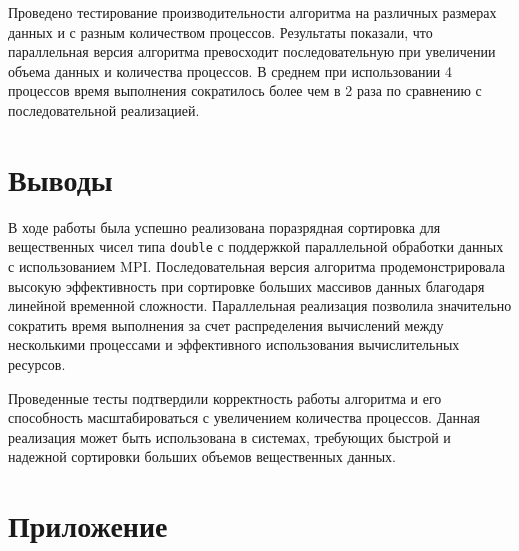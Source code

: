\documentclass[a4paper,12pt]{article}
\begin{document}
Проведено тестирование производительности алгоритма на различных размерах данных и с разным количеством процессов. Результаты показали, что параллельная версия алгоритма превосходит последовательную при увеличении объема данных и количества процессов. В среднем при использовании 4 процессов время выполнения сократилось более чем в 2 раза по сравнению с последовательной реализацией.

\section{Выводы}

В ходе работы была успешно реализована поразрядная сортировка для вещественных чисел типа \texttt{double} с поддержкой параллельной обработки данных с использованием MPI. Последовательная версия алгоритма продемонстрировала высокую эффективность при сортировке больших массивов данных благодаря линейной временной сложности. Параллельная реализация позволила значительно сократить время выполнения за счет распределения вычислений между несколькими процессами и эффективного использования вычислительных ресурсов.

Проведенные тесты подтвердили корректность работы алгоритма и его способность масштабироваться с увеличением количества процессов. Данная реализация может быть использована в системах, требующих быстрой и надежной сортировки больших объемов вещественных данных.

\section{Приложение}
\end{document}
